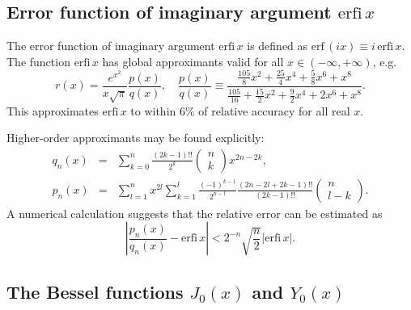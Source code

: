 \documentclass{llncs}
\begin{document}
\subsection{Error function of imaginary argument $\textrm{erfi}\, x$}

The error function of imaginary argument $\textrm{erfi}\, x$ is defined
as $\textrm{erf}\, (ix)\equiv i\, \textrm{erfi}\, x$. The function
$\textrm{erfi}\, x$ has global approximants valid for all $x\in \left(-\infty ,+\infty \right)$,
e.g.\begin{equation}
r\left(x\right)=\frac{e^{x^{2}}}{x\sqrt{\pi }}\frac{p\left(x\right)}{q\left(x\right)},\quad \frac{p\left(x\right)}{q\left(x\right)}\equiv \frac{\frac{105}{8}x^{2}+\frac{25}{4}x^{4}+\frac{5}{8}x^{6}+x^{8}}{\frac{105}{16}+\frac{15}{2}x^{2}+\frac{9}{2}x^{4}+2x^{6}+x^{8}}.\label{eq:erfiansatz}\end{equation}
This approximates $\textrm{erfi}\, x$ to within $6\%$ of relative
accuracy for all real $x$.

Higher-order approximants may be found explicitly:\begin{eqnarray}
q_{n}\left(x\right) & = & \sum _{k=0}^{n}\frac{\left(2k-1\right)!!}{2^{k}}\left(\begin{array}{c}
 n\\
 k\end{array}
\right)x^{2n-2k},\\
p_{n}\left(x\right) & = & \sum _{l=1}^{n}x^{2l}\sum _{k=1}^{l}\frac{\left(-1\right)^{k-1}}{2^{n-l}}\frac{\left(2n-2l+2k-1\right)!!}{\left(2k-1\right)!!}\left(\begin{array}{c}
 n\\
 l-k\end{array}
\right).
\end{eqnarray}
A numerical calculation suggests that the relative error can be estimated
as\begin{equation}
\left|\frac{p_{n}\left(x\right)}{q_{n}\left(x\right)}-\textrm{erfi}\, x\right|<2^{-n}\sqrt{\frac{n}{2}}\left|\textrm{erfi}\, x\right|.\end{equation}



\subsection{The Bessel functions $J_{0}\left(x\right)$ and $Y_{0}\left(x\right)$}
\end{document}
